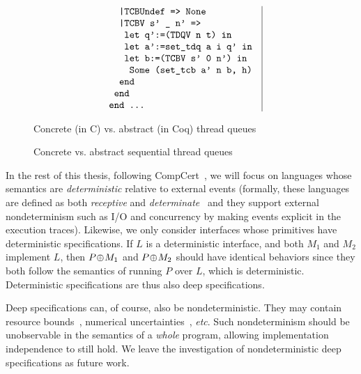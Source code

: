 {\begin{figure}[t]
$$\begin{array}{l|l}
\begin{array}[t]{l}
\verb+  |TCBUndef => None+\\
\verb+  |TCBV s' _ n' =>+\\
\verb+   let q':=(TDQV n t) in+\\
\verb+   let a':=set_tdq a i q' in+\\
\verb+   let b:=(TCBV s' 0 n') in+\\
\verb+    Some (set_tcb a' n b, h)+\\
\verb+  end+\\
\verb+ end+\\
\verb+end ...+
\end{array}
\end{array}
$$ 
\caption{Concrete (in C) vs. abstract (in Coq) thread queues}
\label{fig:queue}
\end{figure}}

\begin{figure}[tb]\centering
\subfloat[Concrete implementation in C]{
\label{fig:queue:a}
    \begin{minipage}{0.5\textwidth}
    \centering
 = C] {source_code/seq-dequeue.c}
    \end{minipage}
}
\subfloat[Abstract specification in Coq]
{\label{fig:queue:b}
    \begin{minipage}{0.5\textwidth}
    \centering
 = C] {source_code/seq-dequeue.v}
  \end{minipage}
}\caption{Concrete vs. abstract sequential thread queues}
\hrulefill
\label{fig:queue}
\end{figure}

In the rest of this thesis, following CompCert~\cite{Leroy-backend}, we
will focus on languages whose semantics are {\em
  deterministic} relative to external events (formally, these
languages are defined as both {\em receptive} and {\em
  determinate}~\cite{sevcik13} and they support external
nondeterminism such as I/O and concurrency by making events explicit 
in the execution traces).
Likewise, we only consider interfaces whose primitives
have deterministic specifications. If $L$ is a deterministic interface, 
and both $M_1$ and $M_2$ implement $L$, then $P\!\oplus\! M_1$ and $P\!\oplus\! M_2$
should have identical behaviors since they both follow the semantics
of running $P$ over $L$, which is deterministic. Deterministic 
specifications are thus also deep specifications.

Deep specifications can, of course, also be nondeterministic. They may
contain resource bounds~\cite{veristack}, numerical
uncertainties~\cite{chaudhuri10}, {\em etc}. Such nondeterminism should
be unobservable in the semantics of a {\em whole} program,
allowing implementation independence to still hold.  We leave the
investigation of nondeterministic deep specifications as future work.


